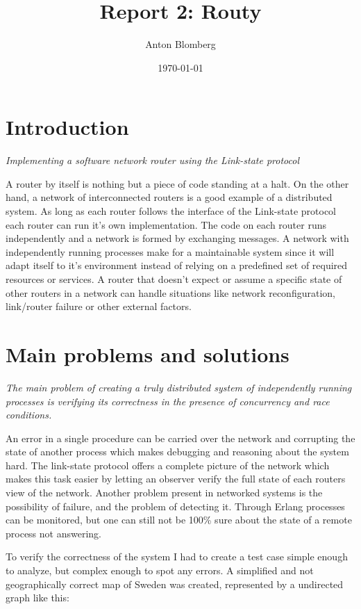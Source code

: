 \documentclass[a4paper, 11pt]{article}
\title{Report 2: Routy}
\author{Anton Blomberg}
\date{\today{}}
\begin{document}
\maketitle

\section{Introduction}

\textit{Implementing a software network router using the Link-state protocol}

A router by itself is nothing but a piece of code standing at a halt. On the other hand, a network of interconnected
routers is a good example of a distributed system. As long as each router follows the interface of the Link-state
protocol each router can run it's own implementation. The code on each router runs independently and a network is formed
by exchanging messages.
A network with independently running processes make for a maintainable system since it will adapt itself to it's
environment instead of relying on a predefined set of required resources or services. A router that doesn't expect or
assume a specific state of other routers in a network can handle situations like network reconfiguration, link/router
failure or other external factors.


\section{Main problems and solutions}

\textit{The main problem of creating a truly distributed system of independently running processes is verifying its
correctness in the presence of concurrency and race conditions.}

An error in a single procedure can be carried over the network and corrupting the state of another process which makes
debugging and reasoning about the system hard. The link-state protocol offers a complete picture of the network which
 makes this task easier by letting an observer verify the full state of each routers view of the network.
Another problem present in networked systems is the possibility of failure, and the problem of detecting it. Through
 Erlang processes can be monitored, but one can still not be 100\% sure about the state of a remote process not
 answering.

\pagebreak
To verify the correctness of the system I had to create a test case simple enough to analyze, but complex enough to
spot any errors. A simplified and not geographically correct map of Sweden was created, represented by a undirected
graph like this:
\end{document}
